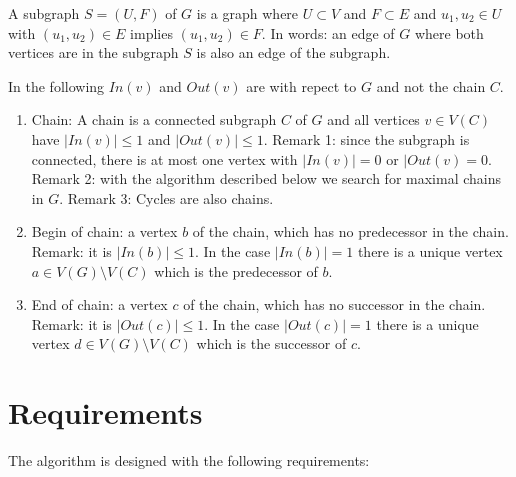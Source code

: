 \documentclass[12pt,a4paper]{report}
\begin{document}
A subgraph $S = (U,F)$ of $G$ is a graph where $U \subset V$ and $F \subset E$ and $u_1, u_2 \in U$ 
with $(u_1, u_2) \in E$ implies $(u_1, u_2) \in F$. In words: an edge of $G$ where both vertices 
are in the subgraph $S$ is also an edge of the subgraph.

In the following $In(v)$ and $Out(v)$ are with repect to $G$ and not the chain $C$.

\begin{enumerate}
\item Chain: A chain is a connected subgraph $C$ of $G$ and all vertices $v\in V(C)$ have 
$|In(v)| \le 1$ and $|Out(v)| \le 1$. Remark 1: since the subgraph is connected, there is at most 
one vertex with $|In(v)| = 0$ or $|Out(v) = 0$. Remark 2: with the algorithm described below we 
search for maximal chains in $G$. Remark 3: Cycles are also chains.

\item Begin of chain: a vertex $b$ of the chain, which has no predecessor in the chain.
Remark: it is $|In(b)| \le 1$. In the case $|In(b)| = 1$ there is a unique vertex 
$a \in V(G) \setminus V(C)$ which is the predecessor of $b$.

\item End of chain: a vertex $c$ of the chain, which has no successor in the chain.
Remark: it is $|Out(c)| \le 1$. In the case $|Out(c)| = 1$ there is a unique vertex 
$d \in V(G) \setminus V(C)$ which is the successor of $c$.

\end{enumerate}

\chapter{Requirements}
The algorithm is designed with the following requirements:
\end{document}
